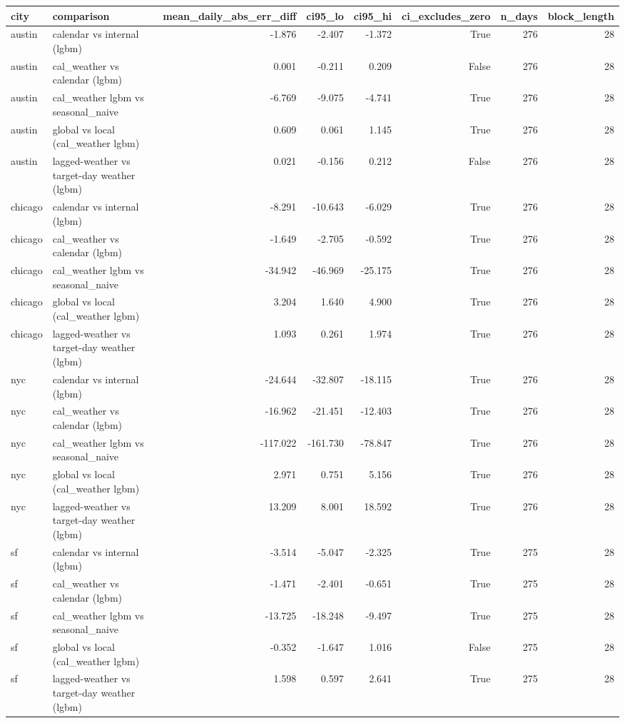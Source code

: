 \begin{tabular}{llrrrrrr}
\toprule
city & comparison & mean\_daily\_abs\_err\_diff & ci95\_lo & ci95\_hi & ci\_excludes\_zero & n\_days & block\_length \\
\midrule
austin & calendar vs internal (lgbm) & -1.876 & -2.407 & -1.372 & True & 276 & 28 \\
austin & cal\_weather vs calendar (lgbm) & 0.001 & -0.211 & 0.209 & False & 276 & 28 \\
austin & cal\_weather lgbm vs seasonal\_naive & -6.769 & -9.075 & -4.741 & True & 276 & 28 \\
austin & global vs local (cal\_weather lgbm) & 0.609 & 0.061 & 1.145 & True & 276 & 28 \\
austin & lagged-weather vs target-day weather (lgbm) & 0.021 & -0.156 & 0.212 & False & 276 & 28 \\
chicago & calendar vs internal (lgbm) & -8.291 & -10.643 & -6.029 & True & 276 & 28 \\
chicago & cal\_weather vs calendar (lgbm) & -1.649 & -2.705 & -0.592 & True & 276 & 28 \\
chicago & cal\_weather lgbm vs seasonal\_naive & -34.942 & -46.969 & -25.175 & True & 276 & 28 \\
chicago & global vs local (cal\_weather lgbm) & 3.204 & 1.640 & 4.900 & True & 276 & 28 \\
chicago & lagged-weather vs target-day weather (lgbm) & 1.093 & 0.261 & 1.974 & True & 276 & 28 \\
nyc & calendar vs internal (lgbm) & -24.644 & -32.807 & -18.115 & True & 276 & 28 \\
nyc & cal\_weather vs calendar (lgbm) & -16.962 & -21.451 & -12.403 & True & 276 & 28 \\
nyc & cal\_weather lgbm vs seasonal\_naive & -117.022 & -161.730 & -78.847 & True & 276 & 28 \\
nyc & global vs local (cal\_weather lgbm) & 2.971 & 0.751 & 5.156 & True & 276 & 28 \\
nyc & lagged-weather vs target-day weather (lgbm) & 13.209 & 8.001 & 18.592 & True & 276 & 28 \\
sf & calendar vs internal (lgbm) & -3.514 & -5.047 & -2.325 & True & 275 & 28 \\
sf & cal\_weather vs calendar (lgbm) & -1.471 & -2.401 & -0.651 & True & 275 & 28 \\
sf & cal\_weather lgbm vs seasonal\_naive & -13.725 & -18.248 & -9.497 & True & 275 & 28 \\
sf & global vs local (cal\_weather lgbm) & -0.352 & -1.647 & 1.016 & False & 275 & 28 \\
sf & lagged-weather vs target-day weather (lgbm) & 1.598 & 0.597 & 2.641 & True & 275 & 28 \\
\bottomrule
\end{tabular}
